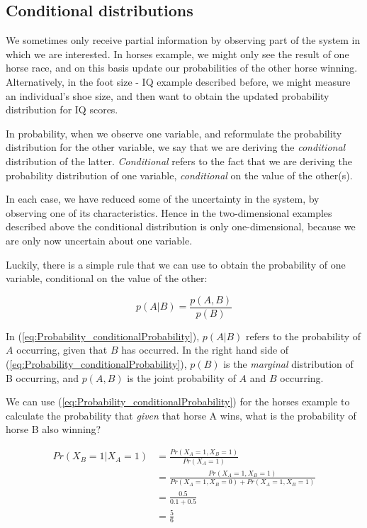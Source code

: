 \documentclass[11pt,fullpage]{book}
\begin{document}
\subsection{Conditional distributions}\label{sec:Probability_conditionalDistributionIntro}
We sometimes only receive partial information by observing part of the system in which we are interested. In horses example, we might only see the result of one horse race, and on this basis update our probabilities of the other horse winning. Alternatively, in the foot size - IQ example described before, we might measure an individual's shoe size, and then want to obtain the updated probability distribution for IQ scores.

In probability, when we observe one variable, and reformulate the probability distribution for the other variable, we say that we are deriving the \textit{conditional} distribution of the latter. \textit{Conditional} refers to the fact that we are deriving the probability distribution of one variable, \textit{conditional} on the value of the other(s).

In each case, we have reduced some of the uncertainty in the system, by observing one of its characteristics. Hence in the two-dimensional examples described above the conditional distribution is only one-dimensional, because we are only now uncertain about one variable. 

Luckily, there is a simple rule that we can use to obtain the probability of one variable, conditional on the value of the other:

\begin{equation}\label{eq:Probability_conditionalProbability}
p(A|B) = \frac{p(A,B)}{p(B)}
\end{equation}

In (\ref{eq:Probability_conditionalProbability}), $p(A|B)$ refers to the probability of $A$ occurring, given that $B$ has occurred. In the right hand side of (\ref{eq:Probability_conditionalProbability}), $p(B)$ is the \textit{marginal} distribution of B occurring, and $p(A,B)$ is the joint probability of $A$ and $B$ occurring.

We can use (\ref{eq:Probability_conditionalProbability}) for the horses example to calculate the probability that \textit{given} that horse A wins, what is the probability of horse B also winning?

\begin{equation}\label{eq:Probability_conditionalDiscreteCoins}
\begin{align}
Pr(X_B=1|X_A=1) &= \frac{Pr(X_A=1,X_B=1)}{Pr(X_A=1)}\\
&= \frac{Pr(X_A=1,X_B=1)}{Pr(X_A=1,X_B=0)+Pr(X_A=1,X_B=1)}\\
&= \frac{0.5}{0.1 + 0.5}\\ 
&= \frac{5}{6}
\end{align}
\end{equation}
\end{document}
